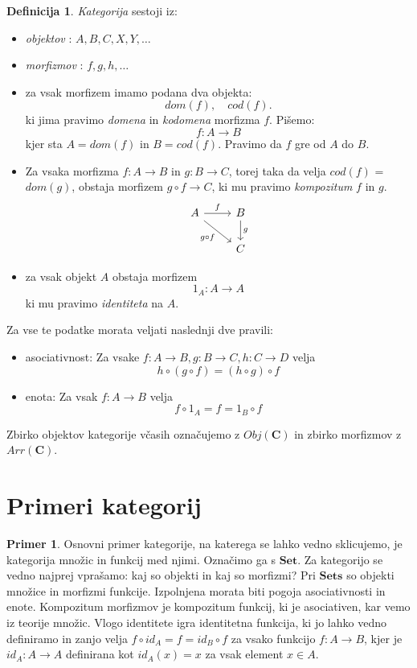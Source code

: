\documentclass[12pt,a4paper]{book}
\theoremstyle{definition}
\newtheorem{definicija}{Definicija}[chapter]
\theoremstyle{plain}
\theoremstyle{definition}
\newtheorem{primer}{Primer}[section]
\theoremstyle{remark}
\newcommand{\cat}[1]{\textbf{#1}}
\begin{document}
\begin{definicija}
\emph{Kategorija} sestoji iz:
\begin{itemize}
\item \emph{objektov} : $A,B,C,X,Y,\ldots$
\item \emph{morfizmov} : $f,g,h,\ldots$
\item za vsak morfizem imamo podana dva objekta: $$dom(f), \quad cod(f).$$
ki jima pravimo \emph{domena} in \emph{kodomena} morfizma $f$. Pišemo:
$$f\colon A \to B$$
kjer sta $A = dom(f)$ in $B = cod(f)$.
Pravimo da $f$ gre od $A$ do $B$.
\item Za vsaka morfizma $f \colon A \to B$ in $g \colon B \to C$, torej taka da velja $cod(f)$ = $dom(g)$, obstaja morfizem $g\circ f \to C$, ki mu pravimo \emph{kompozitum} $f$ in $g$.
%
\[
\begin{tikzcd}
A \arrow[r, "f"] \arrow[rd, "g \circ f"']  & B  \arrow[d, "g"] \\
				& C
\end{tikzcd}
\] 
%
\item za vsak objekt $A$ obstaja morfizem
$$1_A : A \to A$$
ki mu pravimo \emph{identiteta} na $A$.		
\end{itemize}
Za vse te podatke morata veljati naslednji dve pravili:
\begin{itemize}
\item asociativnost: Za vsake $f : A \to B, g : B \to C, h : C \to D$ velja
$$h \circ (g \circ f) = (h \circ g) \circ f$$
\item enota: Za vsak $f : A \to B$ velja
$$f \circ 1_A = f = 1_B \circ f$$
\end{itemize}
\end{definicija}
%
Zbirko objektov kategorije včasih označujemo z $Obj(\cat{C})$ in zbirko morfizmov z $Arr(\cat{C})$.

\section{Primeri kategorij}

\begin{primer}
Osnovni primer kategorije, na katerega se lahko vedno sklicujemo, je kategorija množic in funkcij med njimi. Označimo ga s $\cat{Set}$. Za kategorijo se vedno najprej vprašamo: kaj so objekti in kaj so morfizmi? Pri $\cat{Sets}$ so objekti množice in morfizmi funkcije.
Izpolnjena morata biti pogoja asociativnosti in enote.
Kompozitum morfizmov je kompozitum funkcij, ki je asociativen, kar vemo iz teorije množic.
Vlogo identitete igra identitetna funkcija, ki jo lahko vedno definiramo in zanjo velja $f \circ id_A = f = id_B \circ f$ za vsako funkcijo $f : A \to B$, kjer je $id_A : A \to A$ definirana kot $id_A(x) = x$ za vsak element $x \in A$.
\end{primer}
\end{document}
